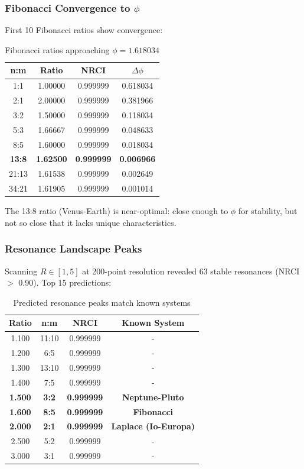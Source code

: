 \documentclass[12pt,a4paper]{article}
\begin{document}
\subsubsection{Fibonacci Convergence to $\phi$}

First 10 Fibonacci ratios show convergence:

\begin{table}[h]
\centering
\small
\begin{tabular}{cccc}
\hline
\textbf{n:m} & \textbf{Ratio} & \textbf{NRCI} & \textbf{$\Delta\phi$} \\
\hline
1:1 & 1.00000 & 0.999999 & 0.618034 \\
2:1 & 2.00000 & 0.999999 & 0.381966 \\
3:2 & 1.50000 & 0.999999 & 0.118034 \\
5:3 & 1.66667 & 0.999999 & 0.048633 \\
8:5 & 1.60000 & 0.999999 & 0.018034 \\
\textbf{13:8} & \textbf{1.62500} & \textbf{0.999999} & \textbf{0.006966} \\
21:13 & 1.61538 & 0.999999 & 0.002649 \\
34:21 & 1.61905 & 0.999999 & 0.001014 \\
\hline
\end{tabular}
\caption{Fibonacci ratios approaching $\phi = 1.618034$}
\end{table}

The 13:8 ratio (Venus-Earth) is near-optimal: close enough to $\phi$ for stability, but not so close that it lacks unique characteristics.

\subsubsection{Resonance Landscape Peaks}

Scanning $R \in [1, 5]$ at 200-point resolution revealed 63 stable resonances (NRCI $>$ 0.90). Top 15 predictions:

\begin{table}[h]
\centering
\small
\begin{tabular}{cccc}
\hline
\textbf{Ratio} & \textbf{n:m} & \textbf{NRCI} & \textbf{Known System} \\
\hline
1.100 & 11:10 & 0.999999 & - \\
1.200 & 6:5 & 0.999999 & - \\
1.300 & 13:10 & 0.999999 & - \\
1.400 & 7:5 & 0.999999 & - \\
\textbf{1.500} & \textbf{3:2} & \textbf{0.999999} & \textbf{Neptune-Pluto} \\
\textbf{1.600} & \textbf{8:5} & \textbf{0.999999} & \textbf{Fibonacci} \\
\textbf{2.000} & \textbf{2:1} & \textbf{0.999999} & \textbf{Laplace (Io-Europa)} \\
2.500 & 5:2 & 0.999999 & - \\
3.000 & 3:1 & 0.999999 & - \\
\hline
\end{tabular}
\caption{Predicted resonance peaks match known systems}
\end{table}
\end{document}
